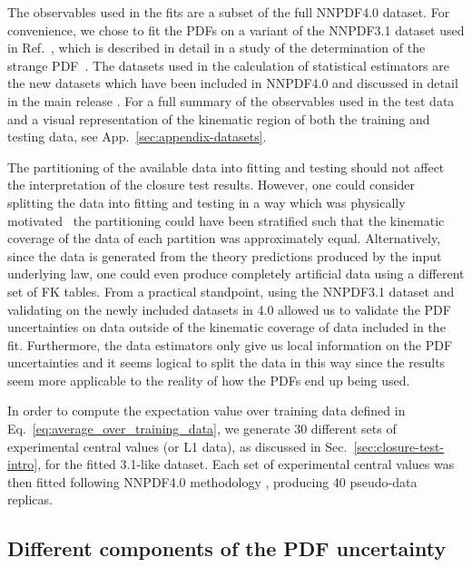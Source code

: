The observables used in the fits are a subset of the full NNPDF4.0 dataset. For
convenience, we chose to fit the PDFs on a variant of the NNPDF3.1 dataset used
in Ref.~\cite{Ball_2018}, which is described in detail in a study of the
determination of the strange PDF~\cite{Faura_2020}. The datasets used in the
calculation of statistical estimators are the new datasets which have been
included in NNPDF4.0 and discussed in detail in the main release \cite{NNPDF40}. For a
full summary of the observables used in the test data and a visual representation of
the kinematic region of both the training and testing data, see
App.~\ref{sec:appendix-datasets}.

The partitioning of the available data into fitting and testing should not
affect the interpretation of the closure test results. However, one
could consider splitting the data into fitting and testing in a way which was
physically motivated \eg\ the partitioning could have been
stratified such that the kinematic coverage of the data of each partition
was approximately equal.
Alternatively, since the data is generated from the theory predictions produced
by the input underlying law, one could even produce completely artificial data
using a different set of FK tables. From a practical standpoint, using the
NNPDF3.1 dataset and validating on the newly included datasets in 4.0 allowed us
to validate the PDF uncertainties on data outside of the kinematic coverage of
data included in the fit. Furthermore, the data estimators only give us local
information on the PDF uncertainties and it seems logical to split the data in
this way since the results seem more applicable to the reality of how the PDFs
end up being used.

In order to compute the expectation value over training data defined in
Eq.~\ref{eq:average_over_training_data}, we generate 30 different sets of
experimental central values (or L1 data), as discussed in
Sec.~\ref{sec:closure-test-intro}, for the fitted 3.1-like dataset. Each set of
experimental central values was then fitted following NNPDF4.0 methodology
\cite{NNPDF40}, producing 40 pseudo-data replicas.


\subsection{Different components of the PDF uncertainty}


